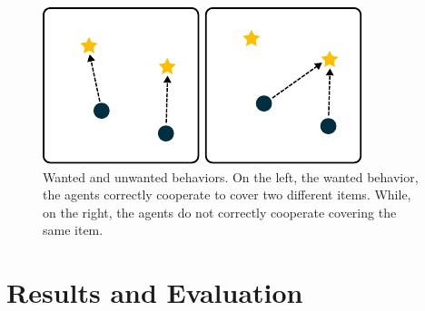 \documentclass[sigconf]{acmart}
\begin{document}
\begin{figure}
  \centering
  \includegraphics[width=1\linewidth]{figures/behavior.pdf}
  \caption{Wanted and unwanted behaviors.
  On the left, the wanted behavior, the agents correctly cooperate to cover
  two different items.
  While, on the right, the agents do not correctly cooperate covering
  the same item.
  }
  \label{fig:behavior}
\end{figure}


\section{Results and Evaluation}\label{sec:results}
\end{document}
